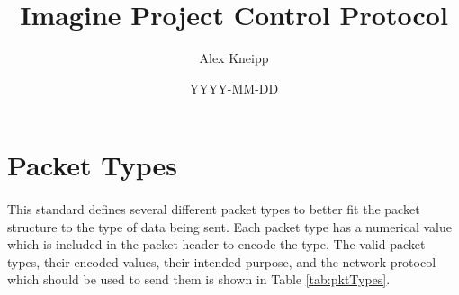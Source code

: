\documentclass[11pt]{article}
\begin{document}

\title{Imagine Project Control Protocol}
\author{Alex Kneipp}
\date{YYYY-MM-DD}
\maketitle

\hspace{1in}

\tableofcontents

\newpage

\section {Packet Types}
\paragraph{}
This standard defines several different packet types to better fit the packet structure to the type of data being sent.
Each packet type has a numerical value which is included in the packet header to encode the type.
The valid packet types, their encoded values, their intended purpose, 
and the network protocol which should be used to send them is shown in Table \ref{tab:pktTypes}.
\end{document}
